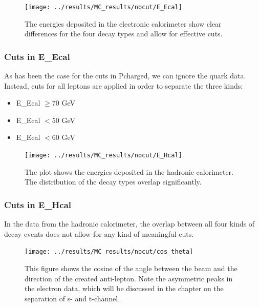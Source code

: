 \newpage
\begin{figure}[H]
\centering
\texttt{[image: ../results/MC\_results/nocut/E\_Ecal]}
\caption[E\_Ecal in simulations]{The energies deposited in the electronic calorimeter show clear differences for the four decay types and allow for effective cuts.}
\label{fig:E_Ecal}
\end{figure}

\subsubsection{Cuts in E\_Ecal}
As has been the case for the cuts in Pcharged, we can ignore the quark data. Instead, cuts for all leptons are applied in order to separate the three kinds:

\begin{itemize}
	\item{ E\_Ecal $\ge70$ GeV}
	\item{ E\_Ecal $<50$ GeV}
	\item{ E\_Ecal $<60$ GeV}
\end{itemize}

\newpage
\begin{figure}[H]
\centering
\texttt{[image: ../results/MC\_results/nocut/E\_Hcal]}
\caption[E\_Hcal in simulation data]{The plot shows the energies deposited in the hadronic calorimeter. The distribution of the decay types overlap significantly.}
\label{fig:E_Hcal}
\end{figure}

\subsubsection{Cuts in E\_Hcal}
In the data from the hadronic calorimeter, the overlap between all four kinds of decay events does not allow for any kind of meaningful cuts.

\newpage
\begin{figure}[H]
\centering
\texttt{[image: ../results/MC\_results/nocut/cos\_theta]}
\caption[Cos\_theta in simulation data]{This figure shows the cosine of the angle between the beam and the direction of the created anti-lepton. Note the asymmetric peaks in the electron data, which will be discussed in the chapter on the separation of s- and t-channel.}
\label{fig:cos_theta}
\end{figure}

